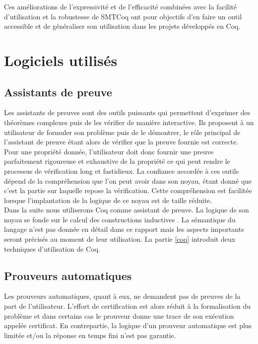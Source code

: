 \documentclass[11pt]{article}
\begin{document}
Ces améliorations de l'expressivité et de l'efficacité combinées avec la facilité d'utilisation et la robustesse de SMTCoq ont pour objectifs d'en faire un outil accessible et de généraliser son utilisation dans les projets développés en Coq.



\newpage
\section{Logiciels utilisés}

\subsection{Assistants de preuve}\label{assistants}

Les assistants de preuves sont des outils puissants qui permettent d'exprimer des théorèmes complexes puis de les vérifier de manière interactive. Ils proposent à un utilisateur de formuler son problème puis de le démontrer, le rôle principal de l'assistant de preuve étant alors de vérifier que la preuve fournie est correcte. Pour une propriété donnée, l'utilisateur doit donc fournir une preuve parfaitement rigoureuse et exhaustive de la propriété ce qui peut rendre le processus de vérification long et fastidieux. La confiance accordée à ces outils dépend de la compréhension que l'on peut avoir dans son noyau, étant donné que c'est la partie sur laquelle repose la vérification. Cette compréhension est facilitée lorsque l'implantation de la logique de ce noyau est de taille réduite. \\

Dans la suite nous utiliserons Coq comme assistant de preuve. La logique de son noyau se fonde sur le calcul des constructions inductives \cite{coq_intro}. La sémantique du langage n'est pas donnée en détail dans ce rapport mais les aspects importants seront précisés au moment de leur utilisation. La partie \ref{coq} introduit deux techniques d'utilisation de Coq.

\subsection{Prouveurs automatiques}\label{prouveurs}

Les prouveurs automatiques, quant à eux, ne demandent pas de preuves de la part de l'utilisateur. L'effort de certification est alors réduit à la formalisation du problème et dans certains cas le prouveur donne une trace de son exécution appelée certificat. En contrepartie, la logique d'un prouveur automatique est plus limitée et/ou la réponse en temps fini n'est pas garantie.\\
\end{document}
